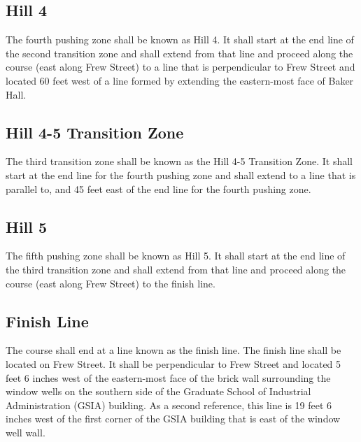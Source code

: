 \subsection{Hill 4}

The fourth pushing zone shall be known as Hill 4. It shall start at the end line of the second transition zone and shall extend from that line and proceed along the course (east along Frew Street) to a line that is perpendicular to Frew Street and located 60 feet west of a line formed by extending the eastern-most face of Baker Hall.

\subsection{Hill 4-5 Transition Zone}

The third transition zone shall be known as the Hill 4-5 Transition Zone. It shall start at the end line for the fourth pushing zone and shall extend to a line that is parallel to, and 45 feet east of the end line for the fourth pushing zone.

\subsection{Hill 5}

The fifth pushing zone shall be known as Hill 5. It shall start at the end line of the third transition zone and shall extend from that line and proceed along the course (east along Frew Street) to the finish line.

\subsection{Finish Line}

The course shall end at a line known as the finish line. The finish line shall be located on Frew Street. It shall be perpendicular to Frew Street and located 5 feet 6 inches west of the eastern-most face of the brick wall surrounding the window wells on the southern side of the Graduate School of Industrial Administration (GSIA) building. As a second reference, this line is 19 feet 6 inches west of the first corner of the GSIA building that is east of the window well wall.


